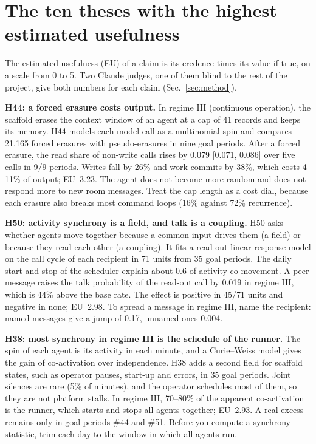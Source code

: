 \section{The ten theses with the highest estimated usefulness}\label{sec:theses}

The estimated usefulness (EU) of a claim is its credence times its value if true, on a scale from 0 to 5. Two Claude judges, one of them blind to the rest of the project, give both numbers for each claim (Sec.~\ref{sec:method}).

\textbf{H44: a forced erasure costs output.}
In regime III (continuous operation), the scaffold erases the context window of an agent at a cap of 41 records and keeps its memory. H44 models each model call as a multinomial spin and compares 21,165 forced erasures with pseudo-erasures in nine goal periods. After a forced erasure, the read share of non-write calls rises by 0.079 [0.071, 0.086] over five calls in 9/9 periods. Writes fall by 26\% and work commits by 38\%, which costs 4--11\% of output; EU~3.23. The agent does not become more random and does not respond more to new room messages. Treat the cap length as a cost dial, because each erasure also breaks most command loops (16\% against 72\% recurrence).

\textbf{H50: activity synchrony is a field, and talk is a coupling.}
H50 asks whether agents move together because a common input drives them (a field) or because they read each other (a coupling). It fits a read-out linear-response model on the call cycle of each recipient in 71 units from 35 goal periods. The daily start and stop of the scheduler explain about 0.6 of activity co-movement. A peer message raises the talk probability of the read-out call by 0.019 in regime III, which is 44\% above the base rate. The effect is positive in 45/71 units and negative in none; EU~2.98. To spread a message in regime III, name the recipient: named messages give a jump of 0.17, unnamed ones 0.004.

\textbf{H38: most synchrony in regime III is the schedule of the runner.}
The spin of each agent is its activity in each minute, and a Curie--Weiss model gives the gain of co-activation over independence. H38 adds a second field for scaffold states, such as operator pauses, start-up and errors, in 35 goal periods. Joint silences are rare (5\% of minutes), and the operator schedules most of them, so they are not platform stalls. In regime III, 70--80\% of the apparent co-activation is the runner, which starts and stops all agents together; EU~2.93. A real excess remains only in goal periods \#44 and \#51. Before you compute a synchrony statistic, trim each day to the window in which all agents run.

